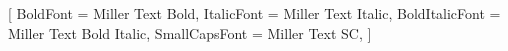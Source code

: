 


\newcommand*{\schola}{texgyreschola-regular.otf}
\newcommand*{\miller}{Miller Text}
\newcommand*{\millerdsc}{Miller Display SC}



\setmainfont{Miller Text}[
  BoldFont       = Miller Text Bold,
  ItalicFont     = Miller Text Italic,
  BoldItalicFont = Miller Text Bold Italic,
  SmallCapsFont  = Miller Text SC,
]

\setmonofont{Fira Code}
